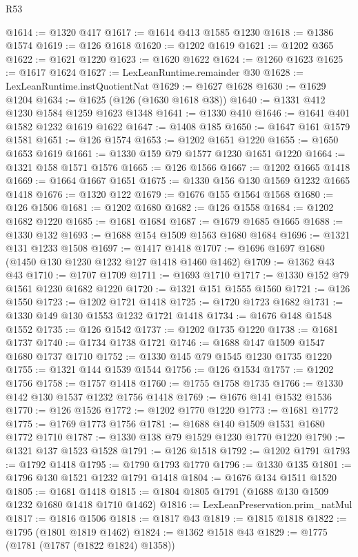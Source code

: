 \begin{lexlean}{R53}
\begin{coremodule}
@1614 := @1320 @417
@1617 := @1614 @413 @1585 @1230
@1618 := @1386 @1574
@1619 := @126 @1618
@1620 := @1202 @1619
@1621 := @1202 @365
@1622 := @1621 @1220
@1623 := @1620 @1622
@1624 := @1260 @1623
@1625 := @1617 @1624
@1627 := LexLeanRuntime.remainder @30
@1628 := LexLeanRuntime.instQuotientNat
@1629 := @1627 @1628
@1630 := @1629 @1204
@1634 := @1625 (@126 (@1630 @1618 @38))
@1640 := @1331 @412 @1230 @1584 @1259 @1623 @1348
@1641 := @1330 @410
@1646 := @1641 @401 @1582 @1232 @1619 @1622
@1647 := @1408 @185
@1650 := @1647 @161 @1579 @1581
@1651 := @126 @1574
@1653 := @1202 @1651 @1220
@1655 := @1650 @1653 @1619
@1661 := @1330 @159 @79 @1577 @1230 @1651 @1220
@1664 := @1321 @158 @1571 @1576
@1665 := @126 @1566
@1667 := @1202 @1665 @1418
@1669 := @1664 @1667 @1651
@1675 := @1330 @156 @130 @1569 @1232 @1665 @1418
@1676 := @1320 @122
@1679 := @1676 @155 @1564 @1568
@1680 := @126 @1506
@1681 := @1202 @1680
@1682 := @126 @1558
@1684 := @1202 @1682 @1220
@1685 := @1681 @1684
@1687 := @1679 @1685 @1665
@1688 := @1330 @132
@1693 := @1688 @154 @1509 @1563 @1680 @1684
@1696 := @1321 @131 @1233 @1508
@1697 := @1417 @1418
@1707 := @1696 @1697 @1680 (@1450 @130 @1230 @1232 @127 @1418 @1460 @1462)
@1709 := @1362 @43 @43
@1710 := @1707 @1709
@1711 := @1693 @1710
@1717 := @1330 @152 @79 @1561 @1230 @1682 @1220
@1720 := @1321 @151 @1555 @1560
@1721 := @126 @1550
@1723 := @1202 @1721 @1418
@1725 := @1720 @1723 @1682
@1731 := @1330 @149 @130 @1553 @1232 @1721 @1418
@1734 := @1676 @148 @1548 @1552
@1735 := @126 @1542
@1737 := @1202 @1735 @1220
@1738 := @1681 @1737
@1740 := @1734 @1738 @1721
@1746 := @1688 @147 @1509 @1547 @1680 @1737 @1710
@1752 := @1330 @145 @79 @1545 @1230 @1735 @1220
@1755 := @1321 @144 @1539 @1544
@1756 := @126 @1534
@1757 := @1202 @1756
@1758 := @1757 @1418
@1760 := @1755 @1758 @1735
@1766 := @1330 @142 @130 @1537 @1232 @1756 @1418
@1769 := @1676 @141 @1532 @1536
@1770 := @126 @1526
@1772 := @1202 @1770 @1220
@1773 := @1681 @1772
@1775 := @1769 @1773 @1756
@1781 := @1688 @140 @1509 @1531 @1680 @1772 @1710
@1787 := @1330 @138 @79 @1529 @1230 @1770 @1220
@1790 := @1321 @137 @1523 @1528
@1791 := @126 @1518
@1792 := @1202 @1791
@1793 := @1792 @1418
@1795 := @1790 @1793 @1770
@1796 := @1330 @135
@1801 := @1796 @130 @1521 @1232 @1791 @1418
@1804 := @1676 @134 @1511 @1520
@1805 := @1681 @1418
@1815 := @1804 @1805 @1791 (@1688 @130 @1509 @1232 @1680 @1418 @1710 @1462)
@1816 := LexLeanPreservation.prim_natMul
@1817 := @1816 @1506
@1818 := @1817 @43
@1819 := @1815 @1818
@1822 := @1795 (@1801 @1819 @1462)
@1824 := @1362 @1518 @43
@1829 := @1775 (@1781 (@1787 (@1822 @1824) @1358))

\end{coremodule}
\end{lexlean}
